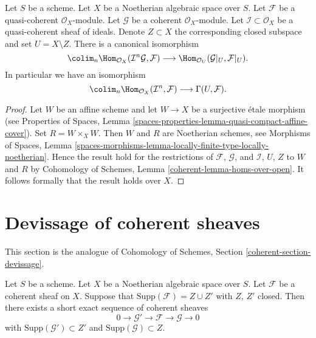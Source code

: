 \begin{lemma}
\label{lemma-homs-over-open}
Let $S$ be a scheme. Let $X$ be a Noetherian algebraic space over $S$.
Let $\mathcal{F}$ be a quasi-coherent $\mathcal{O}_X$-module.
Let $\mathcal{G}$ be a coherent $\mathcal{O}_X$-module.
Let $\mathcal{I} \subset \mathcal{O}_X$ be a quasi-coherent sheaf of
ideals. Denote $Z \subset X$ the corresponding closed subspace and
set $U = X \setminus Z$. There is a canonical isomorphism
$$
\colim_n \Hom_{\mathcal{O}_X}(\mathcal{I}^n\mathcal{G}, \mathcal{F})
\longrightarrow
\Hom_{\mathcal{O}_U}(\mathcal{G}|_U, \mathcal{F}|_U).
$$
In particular we have an isomorphism
$$
\colim_n \Hom_{\mathcal{O}_X}(\mathcal{I}^n, \mathcal{F})
\longrightarrow
\Gamma(U, \mathcal{F}).
$$
\end{lemma}

\begin{proof}
Let $W$ be an affine scheme and let $W \to X$ be a surjective \'etale
morphism (see Properties of Spaces, Lemma
\ref{spaces-properties-lemma-quasi-compact-affine-cover}).
Set $R = W \times_X W$. Then $W$ and $R$ are Noetherian schemes, see
Morphisms of Spaces, Lemma
\ref{spaces-morphisms-lemma-locally-finite-type-locally-noetherian}.
Hence the result hold for the restrictions of $\mathcal{F}$, $\mathcal{G}$,
and $\mathcal{I}$, $U$, $Z$ to $W$ and $R$ by
Cohomology of Schemes, Lemma \ref{coherent-lemma-homs-over-open}.
It follows formally that the result holds over $X$.
\end{proof}






\section{Devissage of coherent sheaves}
\label{section-devissage}

\noindent
This section is the analogue of
Cohomology of Schemes, Section \ref{coherent-section-devissage}.

\begin{lemma}
\label{lemma-prepare-filter-support}
Let $S$ be a scheme. Let $X$ be a Noetherian algebraic space over $S$.
Let $\mathcal{F}$ be a coherent sheaf on $X$. Suppose that
$\text{Supp}(\mathcal{F}) = Z \cup Z'$ with $Z$, $Z'$ closed.
Then there exists a short exact sequence of coherent sheaves
$$
0 \to \mathcal{G}' \to \mathcal{F} \to \mathcal{G} \to 0
$$
with $\text{Supp}(\mathcal{G}') \subset Z'$ and
$\text{Supp}(\mathcal{G}) \subset Z$.
\end{lemma}

